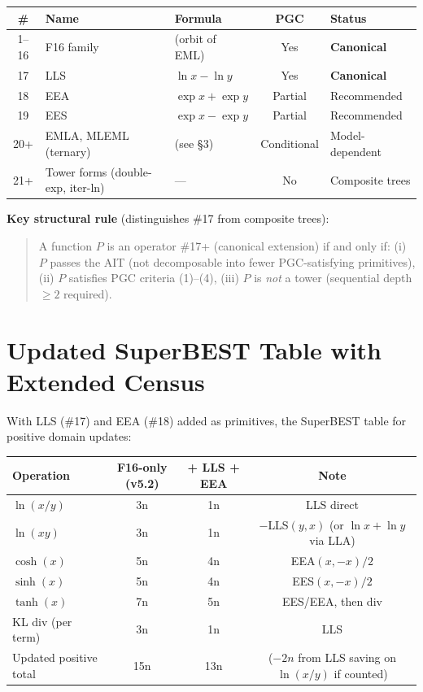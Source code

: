 \documentclass[11pt]{article}
\begin{document}
\begin{center}
\begin{tabular}{cllcl}
\toprule
\# & Name & Formula & PGC & Status \\
\midrule
1--16  & F16 family & (orbit of EML) & Yes & \textbf{Canonical} \\
17     & LLS   & $\ln x - \ln y$           & Yes  & \textbf{Canonical} \\
18     & EEA   & $\exp x + \exp y$          & Partial & Recommended \\
19     & EES   & $\exp x - \exp y$          & Partial & Recommended \\
20+    & EMLA, MLEML (ternary) & (see \S3)  & Conditional & Model-dependent \\
21+    & Tower forms (double-exp, iter-ln) & — & No & Composite trees \\
\bottomrule
\end{tabular}
\end{center}

\noindent \textbf{Key structural rule} (distinguishes \#17 from composite trees):

\begin{quote}
A function $P$ is an operator \#17+ (canonical extension) if and only if:
(i) $P$ passes the AIT (not decomposable into fewer PGC-satisfying primitives),
(ii) $P$ satisfies PGC criteria (1)--(4),
(iii) $P$ is \emph{not} a tower (sequential depth $\geq 2$ required).
\end{quote}

\section{Updated SuperBEST Table with Extended Census}
\label{sec:superbest}

With LLS (\#17) and EEA (\#18) added as primitives, the SuperBEST table for
positive domain updates:

\begin{center}
\begin{tabular}{lccc}
\toprule
Operation & F16-only (v5.2) & + LLS + EEA & Note \\
\midrule
$\ln(x/y)$  & 3n & 1n & LLS direct \\
$\ln(xy)$   & 3n & 1n & $-$LLS$(y,x)$ (or $\ln x + \ln y$ via LLA) \\
$\cosh(x)$  & 5n & 4n & EEA$(x,-x)/2$ \\
$\sinh(x)$  & 5n & 4n & EES$(x,-x)/2$ \\
$\tanh(x)$  & 7n & 5n & EES/EEA, then div \\
KL div (per term) & 3n & 1n & LLS \\
\midrule
Updated positive total & 15n & 13n & ($-2n$ from LLS saving on $\ln(x/y)$ if counted) \\
\bottomrule
\end{tabular}
\end{center}
\end{document}
